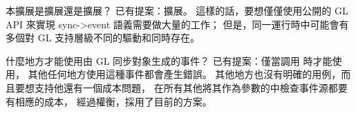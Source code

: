 \startQUESTION
本擴展是擴展還是擴展？
\stopQUESTION
\startANSWER
已有提案：擴展。
這樣的話，要想僅僅使用公開的 GL API 來實現 sync->event 語義需要做大量的工作；
但是，同一運行時中可能會有多個對 GL 支持層級不同的驅動和同時存在。
\stopANSWER

\startQUESTION
什麼地方才能使用由 GL 同步對象生成的事件？
\stopQUESTION
\startANSWER
已有提案：僅當調用  時才能使用，
其他任何地方使用這種事件都會產生錯誤。
其他地方也沒有明確的用例，而且要想支持他還有一個成本問題，
在所有其他將其作為參數的中檢查事件源都要有相應的成本，
經過權衡，採用了目前的方案。
\stopANSWER

